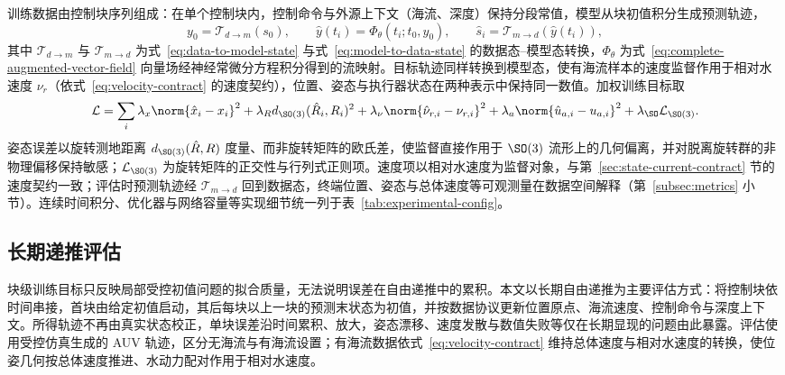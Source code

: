训练数据由控制块序列组成：在单个控制块内，控制命令与外源上下文（海流、深度）保持分段常值，模型从块初值积分生成预测轨迹，
\begin{equation}
  y_0=\mathcal{T}_{d\to m}(s_0),\qquad
  \hat y(t_i)=\Phi_\theta(t_i;t_0,y_0),\qquad
  \hat s_i=\mathcal{T}_{m\to d}(\hat y(t_i)),
  \label{eq:block-prediction}
\end{equation}
其中 \(\mathcal{T}_{d\to m}\) 与 \(\mathcal{T}_{m\to d}\) 为式~\eqref{eq:data-to-model-state} 与式~\eqref{eq:model-to-data-state} 的数据态--模型态转换，\(\Phi_\theta\) 为式~\eqref{eq:complete-augmented-vector-field} 向量场经神经常微分方程积分得到的流映射。目标轨迹同样转换到模型态，使有海流样本的速度监督作用于相对水速度 \(\nu_r\)（依式~\eqref{eq:velocity-contract} 的速度契约），位置、姿态与执行器状态在两种表示中保持同一数值。加权训练目标取
\begin{equation}
  \mathcal{L}
  =
  \sum_i
  \lambda_x\norm{\hat x_i-x_i}^2
  +\lambda_R d_{\SO(3)}(\hat R_i,R_i)^2
  +\lambda_\nu\norm{\hat\nu_{r,i}-\nu_{r,i}}^2
  +\lambda_a\norm{\hat u_{a,i}-u_{a,i}}^2
  +\lambda_{\SO}\mathcal{L}_{\SO(3)} .
  \label{eq:training-loss}
\end{equation}
姿态误差以旋转测地距离 \(d_{\SO(3)}(\hat R,R)\) 度量、而非旋转矩阵的欧氏差，使监督直接作用于 \(\SO(3)\) 流形上的几何偏离，并对脱离旋转群的非物理偏移保持敏感；\(\mathcal{L}_{\SO(3)}\) 为旋转矩阵的正交性与行列式正则项。速度项以相对水速度为监督对象，与第~\ref{sec:state-current-contract} 节的速度契约一致；评估时预测轨迹经 \(\mathcal{T}_{m\to d}\) 回到数据态，终端位置、姿态与总体速度等可观测量在数据空间解释（第~\ref{subsec:metrics} 小节）。连续时间积分、优化器与网络容量等实现细节统一列于表~\ref{tab:experimental-config}。

\subsection{长期递推评估}
\label{subsec:rollout-eval}

块级训练目标只反映局部受控初值问题的拟合质量，无法说明误差在自由递推中的累积。本文以长期自由递推为主要评估方式：将控制块依时间串接，首块由给定初值启动，其后每块以上一块的预测末状态为初值，并按数据协议更新位置原点、海流速度、控制命令与深度上下文。所得轨迹不再由真实状态校正，单块误差沿时间累积、放大，姿态漂移、速度发散与数值失败等仅在长期显现的问题由此暴露。评估使用受控仿真生成的 AUV 轨迹，区分无海流与有海流设置；有海流数据依式~\eqref{eq:velocity-contract} 维持总体速度与相对水速度的转换，使位姿几何按总体速度推进、水动力配对作用于相对水速度。

